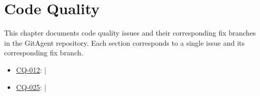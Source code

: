 \chapter{Code Quality}
\label{chap:cq}

This chapter documents code quality issues and their corresponding fix branches in the GitAgent repository. Each section corresponds to a single issue and its corresponding fix branch.

\begin{itemize}
    \item \hyperref[sec:cq-012]{CQ-012}:  | 
    \item \hyperref[sec:cq-025]{CQ-025}:  | 
\end{itemize}




